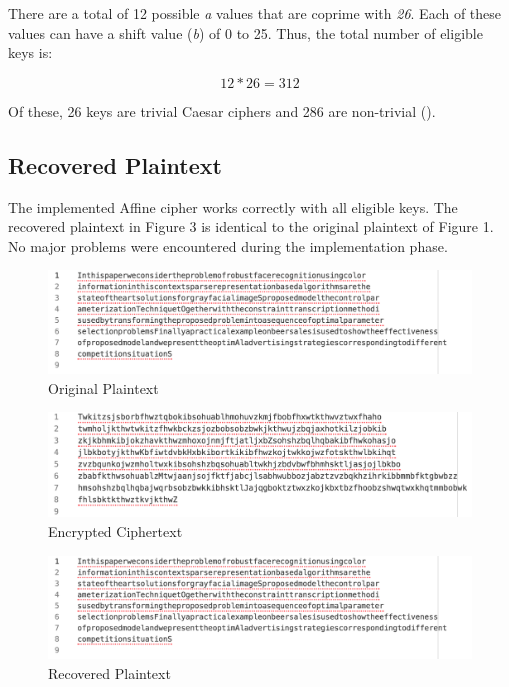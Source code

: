 \documentclass[]{article}
\begin{document}
There are a total of 12 possible \textit{a} values that are coprime with \textit{26}. Each of these values can have a shift value (\textit{b}) of 0 to 25. Thus, the total number of eligible keys is:

$$12*26=312$$

Of these, 26 keys are trivial Caesar ciphers and 286 are non-trivial (\cite{maintext}).
\newpage
\subsection*{Recovered Plaintext}

The implemented Affine cipher works correctly with all eligible keys. The recovered plaintext in Figure 3 is identical to the original plaintext of Figure 1. No major problems were encountered during the implementation phase.
\vspace{1cm}
\begin{figure}[H]
	\includegraphics[width=\textwidth]{affine_plaintext.png}
	\caption{Original Plaintext}
	\centering
\end{figure}

\begin{figure}[H]
	\includegraphics[width=\textwidth]{affine_ciphertext.png}
	\caption{Encrypted Ciphertext}
	\centering
\end{figure}

\begin{figure}[H]
	\includegraphics[width=\textwidth]{affine_plaintext.png}
	\caption{Recovered Plaintext}
	\centering
\end{figure}
\end{document}
